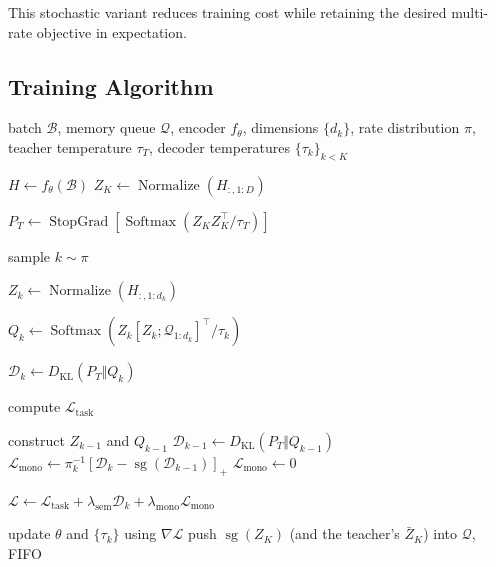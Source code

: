 \documentclass[11pt]{article}
\newcommand{\KL}{D_{\mathrm{KL}}}
\newcommand{\cL}{\mathcal{L}}
\newcommand{\cD}{\mathcal{D}}
\newcommand{\sg}{\operatorname{sg}}
\begin{document}
This stochastic variant reduces training cost while retaining the desired multi-rate objective in expectation.


\subsection{Training Algorithm}

\begin{algorithm}[t]
\caption{SDR-MRL training with stochastic rate sampling}
\label{alg:sdr}
\begin{algorithmic}[1]

\Require batch $\mathcal B$, memory queue $\mathcal Q$, encoder $f_\theta$, dimensions $\{d_k\}$,
rate distribution $\pi$, teacher temperature $\tau_T$, decoder temperatures $\{\tau_k\}_{k<K}$

\State $H \gets f_\theta(\mathcal B)$
\State $Z_K \gets \operatorname{Normalize}(H_{:,1:D})$

\State $P_T \gets
\operatorname{StopGrad}
\left[
\operatorname{Softmax}
(
Z_K Z_K^\top/\tau_T
)
\right]$

\State sample $k\sim\pi$

\State $Z_k \gets
\operatorname{Normalize}
(
H_{:,1:d_k}
)$

\State $Q_k \gets
\operatorname{Softmax}
(
Z_k [Z_k;\mathcal Q_{1:d_k}]^\top/\tau_k
)$ 

\State $\cD_k \gets \KL(P_T\Vert Q_k)$

\State compute $\cL_{\mathrm{task}}$

    \State construct $Z_{k-1}$ and $Q_{k-1}$
    \State $\cD_{k-1}\gets\KL(P_T\Vert Q_{k-1})$
    \State $\cL_{\mathrm{mono}}
    \gets
    \pi_k^{-1}[\cD_k-\sg(\cD_{k-1})]_+$
\Else
    \State $\cL_{\mathrm{mono}}\gets0$
\EndIf

\State $\cL
\gets
\cL_{\mathrm{task}}
+
\lambda_{\mathrm{sem}}\cD_k
+
\lambda_{\mathrm{mono}}\cL_{\mathrm{mono}}$

\State update $\theta$ and $\{\tau_k\}$ using $\nabla\cL$
\State push $\sg(Z_K)$ (and the teacher's $\bar Z_K$) into $\mathcal Q$, FIFO

\end{algorithmic}
\end{algorithm}


\end{document}
